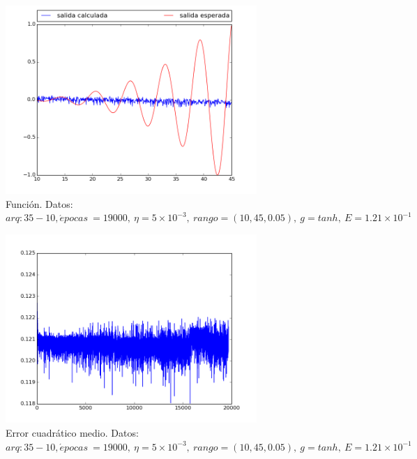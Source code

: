 \documentclass[12pt,a4paper]{article}
\begin{document}
\begin{figure}[H]
\centering
\includegraphics[width=0.85\textwidth]{img/_35_10-eta=0005-FUNCTION.png}
\caption{\label{fig:test5} Función. Datos:  $arq: 35-10, \acute{e} pocas \ =19000,\ \eta = 5 \times 10^{-3}, \ rango=(10, 45, 0.05),\ g=tanh, \ E = 1.21 \times 10^{-1}$}
\end{figure}

\begin{figure}[H]
\centering
\includegraphics[width=0.85\textwidth]{img/_35_10-eta=0005-ERROR.png}
\caption{\label{fig:test5err} Error cuadrático medio. Datos:  $arq: 35-10, \acute{e} pocas \ =19000,\ \eta = 5 \times 10^{-3}, \ rango=(10, 45, 0.05),\ g=tanh, \ E = 1.21 \times 10^{-1}$}
\end{figure}
\end{document}
